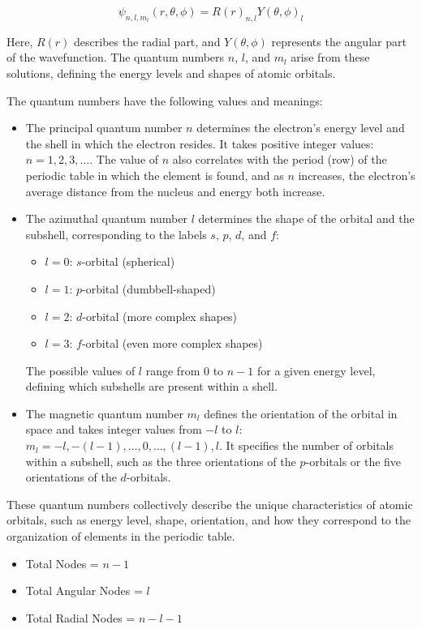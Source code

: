 \documentclass{report}
\begin{document}
\begin{equation}
	\psi_{n,l,m_l}(r, \theta, \phi) = R(r)_{n,l}Y(\theta, \phi)_{l}
\end{equation}

Here, $R(r)$ describes the radial part, and $Y(\theta, \phi)$ represents the angular part of the wavefunction. The quantum numbers $n$, $l$, and $m_l$ arise from these solutions, defining the energy levels and shapes of atomic orbitals.

The quantum numbers have the following values and meanings:
\begin{itemize}
	\item The principal quantum number $n$ determines the electron's energy level and the shell in which the electron resides. It takes positive integer values: $n = 1, 2, 3, \dots$. The value of $n$ also correlates with the period (row) of the periodic table in which the element is found, and as $n$ increases, the electron's average distance from the nucleus and energy both increase.
	\item The azimuthal quantum number $l$ determines the shape of the orbital and the subshell, corresponding to the labels \(s\), \(p\), \(d\), and \(f\):
	      \begin{itemize}
		      \item $l = 0$: $s$-orbital (spherical)
		      \item $l = 1$: $p$-orbital (dumbbell-shaped)
		      \item $l = 2$: $d$-orbital (more complex shapes)
		      \item $l = 3$: $f$-orbital (even more complex shapes)
	      \end{itemize}
	      The possible values of $l$ range from $0$ to $n-1$ for a given energy level, defining which subshells are present within a shell.
	\item The magnetic quantum number $m_l$ defines the orientation of the orbital in space and takes integer values from $-l$ to $l$: $m_l = -l, -(l-1), \dots, 0, \dots, (l-1), l$. It specifies the number of orbitals within a subshell, such as the three orientations of the $p$-orbitals or the five orientations of the $d$-orbitals.
\end{itemize}
These quantum numbers collectively describe the unique characteristics of atomic orbitals, such as energy level, shape, orientation, and how they correspond to the organization of elements in the periodic table.
\begin{itemize}
	\item Total Nodes = $n-1$
	\item Total Angular Nodes = $l$
	\item Total Radial Nodes = $n-l-1$
\end{itemize}
\end{document}

